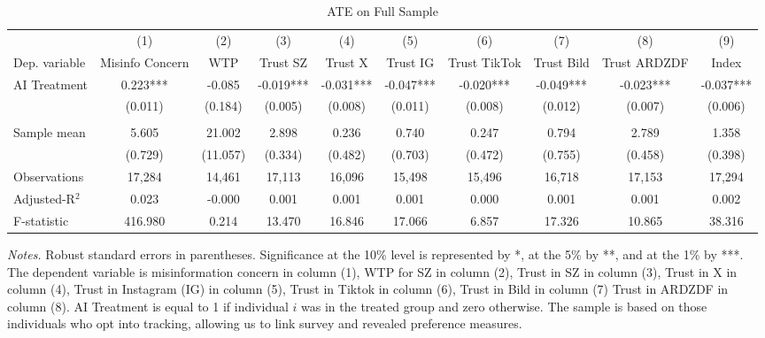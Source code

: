 \begin{table}[H]
 \centering 
 \caption{ATE on Full Sample} 
 \label{tab:resultssurvey_ate} 
 \begin{adjustbox}{max width=\textwidth} 
\begin{tabular}{lccccccccc} 
 \toprule
& (1) & (2) & (3) & (4) & (5) & (6) & (7) & (8) & (9)  \\
 Dep. variable & Misinfo Concern & WTP & Trust SZ & Trust X & Trust IG & Trust TikTok & Trust Bild & Trust ARDZDF & Index\\ 
 \midrule 
AI Treatment    &    0.223***&   -0.085   &   -0.019***&   -0.031***&   -0.047***&   -0.020***&   -0.049***&   -0.023***&   -0.037***\\
                &  (0.011)   &  (0.184)   &  (0.005)   &  (0.008)   &  (0.011)   &  (0.008)   &  (0.012)   &  (0.007)   &  (0.006)   \\
& & & & & & & & &  \\
Sample mean&      5.605 &     21.002 &      2.898 &      0.236 &      0.740 &      0.247 &      0.794 &      2.789 &      1.358  \\
& (0.729) & (11.057) & (0.334) & (0.482) & (0.703) & (0.472) & (0.755) & (0.458) & (0.398)  \\
 \midrule
Observations &     17,284 &     14,461 &     17,113 &     16,096 &     15,498 &     15,496 &     16,718 &     17,153 &     17,294  \\
Adjusted-R$^2$ &      0.023 &     -0.000 &      0.001 &      0.001 &      0.001 &      0.000 &      0.001 &      0.001 &      0.002  \\
F-statistic &    416.980 &      0.214 &     13.470 &     16.846 &     17.066 &      6.857 &     17.326 &     10.865 &     38.316  \\
 \bottomrule
 \end{tabular}
 \end{adjustbox}
 \par
 \begin{minipage}{1\linewidth}
 \baselineskip9pt {\scriptsize \vspace{0.1cm} { \it Notes.} Robust standard errors in parentheses. Significance at the 10\% level is represented by *, at the 5\% by **, and at the 1\% by ***. The dependent variable is misinformation concern in column (1), WTP for SZ in column (2), Trust in SZ in column (3), Trust in X in column (4), Trust in Instagram (IG) in column (5), Trust in Tiktok in column (6), Trust in Bild in column (7) Trust in ARDZDF in column (8). AI Treatment is equal to 1 if individual $i$ was in the treated group and zero otherwise. The sample is based on those individuals who opt into tracking, allowing us to link survey and revealed preference measures.}
 \end{minipage}
 \end{table}
